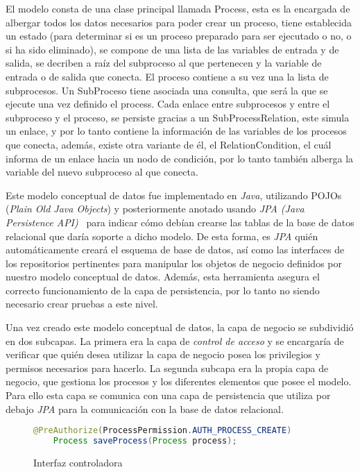 El modelo consta de una clase principal llamada Process, esta es la encargada de albergar todos los datos necesarios para poder crear un proceso, tiene establecida un estado (para determinar si es un proceso preparado para ser ejecutado o no, o si ha sido eliminado), se compone de una lista de las variables de entrada y de salida, se decriben a raíz del subproceso al que pertenecen y la variable de entrada o de salida que conecta. El proceso contiene a su vez una la lista de subprocesos. Un SubProceso tiene asociada una consulta, que será la que se ejecute una vez definido el process. Cada enlace entre subprocesos y entre el subproceso y el proceso, se persiste gracias a un SubProcessRelation, este simula un enlace, y por lo tanto contiene la información de las variables de los procesos que conecta, además, existe otra variante de él, el RelationCondition, el cuál informa de un enlace hacia un nodo de condición, por lo tanto también alberga la variable del nuevo subproceso al que conecta.


Este modelo conceptual de datos fue implementado en \emph{Java}, utilizando POJOs (\emph{Plain Old Java Objects}) y posteriormente anotado usando \emph{JPA (Java Persistence API)}~\cite{jpa} para indicar cómo debían crearse las tablas de la base de datos relacional que daría soporte a dicho modelo. De esta forma, es \emph{JPA} quién automáticamente creará el esquema de base de datos, así como las interfaces de los repositorios pertinentes para manipular los objetos de negocio definidos por nuestro modelo conceptual de datos. Además, esta herramienta asegura el correcto funcionamiento de la capa de persistencia, por lo tanto no siendo necesario crear pruebas a este nivel.

Una vez creado este modelo conceptual de datos, la capa de negocio se subdividió en dos subcapas. La primera era la capa de \emph{control de acceso} y se encargaría de verificar que quién desea utilizar la capa de negocio posea los privilegios y permisos necesarios para hacerlo. La segunda subcapa era la propia capa de negocio, que gestiona los procesos y los diferentes elementos que posee el modelo. Para ello esta capa se comunica con una capa de persistencia que utiliza por debajo \emph{JPA} para la comunicación con la base de datos relacional.

\begin{figure}[H]
	\centering
	\begin{lstlisting}[language=Java]
	@PreAuthorize(ProcessPermission.AUTH_PROCESS_CREATE)
	Process saveProcess(Process process);\end{lstlisting}
	\caption{Interfaz controladora}
	\label{fig:interfazControladora}
\end{figure}

